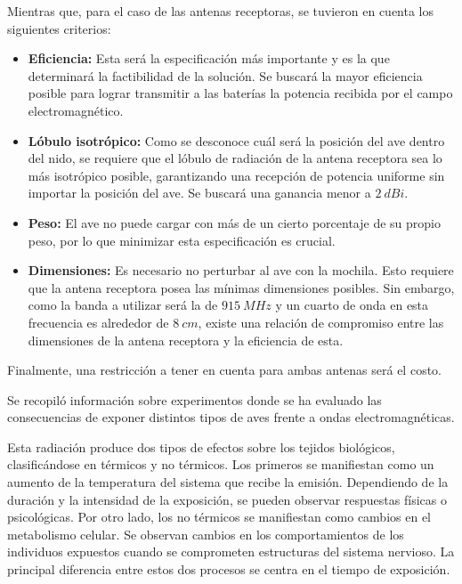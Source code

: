 Mientras que, para el caso de las antenas receptoras, se tuvieron en cuenta los siguientes criterios:
\begin{itemize}
\item \textbf{Eficiencia:} Esta será la especificación más importante y es la que determinará la factibilidad de la solución. Se buscará la mayor eficiencia posible para lograr transmitir a las baterías la potencia recibida por el campo electromagnético.
\item \textbf{Lóbulo isotrópico:} Como se desconoce cuál será la posición del ave dentro del nido, se requiere que el lóbulo de radiación de la antena receptora sea lo más isotrópico posible, garantizando una recepción de potencia uniforme sin importar la posición del ave. Se buscará una ganancia menor a $2 \ dBi$.
\item \textbf{Peso:} El ave no puede cargar con más de un cierto porcentaje de su propio peso, por lo que minimizar esta especificación es crucial.
\item \textbf{Dimensiones:} Es necesario no perturbar al ave con la mochila. Esto requiere que la antena receptora posea las mínimas dimensiones posibles. Sin embargo, como la banda a utilizar será la de $915 \ MHz$ y un cuarto de onda en esta frecuencia es alrededor de $8 \ cm$, existe una relación de compromiso entre las dimensiones de la antena receptora y la eficiencia de esta.
\end{itemize}

Finalmente, una restricción a tener en cuenta para ambas antenas será el costo.


Se recopiló información sobre experimentos donde se ha evaluado las consecuencias de exponer distintos tipos de aves frente a ondas electromagnéticas.

Esta radiación produce dos tipos de efectos sobre los tejidos biológicos, clasificándose en térmicos y no térmicos. Los primeros se manifiestan como un aumento de la temperatura del sistema que recibe la emisión. Dependiendo de la duración y la intensidad de la exposición, se pueden observar respuestas físicas o psicológicas. Por otro lado, los no térmicos se manifiestan como cambios en el metabolismo celular. Se observan cambios en los comportamientos de los individuos expuestos cuando se comprometen estructuras del sistema nervioso. La principal diferencia entre estos dos procesos se centra en el tiempo de exposición.

